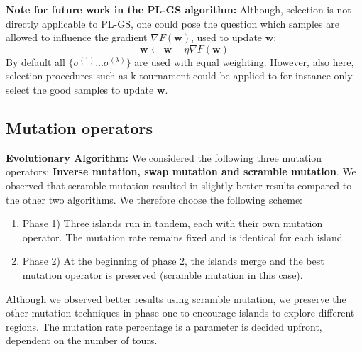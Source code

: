 \documentclass[a4paper,10pt]{article}
\newcommand{\ReplaceMe}[1]{{\color{blue}#1}}
\begin{document}
		
	\textbf{Note for future work in the PL-GS algorithm:}
	Although, selection is not directly applicable to PL-GS, one could pose the question which samples are allowed to influence the gradient $\nabla F\left(\mathbf{w}\right)$, used to update $\mathbf{w}$:
	$$\mathbf{w} \leftarrow \mathbf{w} - \eta \nabla F\left(\mathbf{w}\right)$$
	By default all $\{ \sigma^{(1)} \dots \sigma^{(\lambda)} \} $ are used with equal weighting. However, also here, selection procedures such as k-tournament could be applied to for instance only select the good samples to update $\mathbf{w}$.
	
	
	

\subsection{Mutation operators}
	\textbf{Evolutionary Algorithm:}
	We considered the following three mutation operators: \textbf{Inverse mutation, swap mutation and scramble mutation}. We observed that scramble mutation resulted in slightly better results compared to the other two algorithms. We therefore choose the following scheme: 
	\begin{enumerate}
		\item Phase 1) Three islands run in tandem, each with their own mutation operator. The mutation rate remains fixed and is identical for each island.
		\item Phase 2) At the beginning of phase 2, the islands merge and the best mutation operator is preserved (scramble mutation in this case).
	\end{enumerate}
	Although we observed better results using scramble mutation, we preserve the other mutation techniques in phase one to encourage islands to explore different regions. The mutation rate percentage is a parameter is decided upfront, dependent on the number of tours.
	

\end{document}
